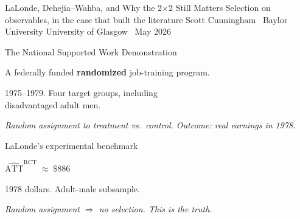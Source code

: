 \documentclass[11pt,aspectratio=169]{beamer}
\begin{document}
\remixtitleframe
  {LaLonde, Dehejia--Wahba, and Why the 2$\times$2 Still Matters}
  {Selection on observables, in the case that built the literature}
  {Scott Cunningham \textperiodcentered\ Baylor University}
  {University of Glasgow \textperiodcentered\ May 2026}


\begin{frame}{The National Supported Work Demonstration}
\vspace{1em}
\begin{center}
\large
A federally funded \textbf{randomized} job-training program.
\end{center}
\vspace{0.4em}
\begin{center}
\large
1975--1979. Four target groups, including \\[0.2em] disadvantaged adult men.
\end{center}
\vspace{0.6em}
\begin{center}
\small\color{warmgray}\itshape
Random assignment to treatment vs.\ control. \;Outcome: real earnings in 1978.
\end{center}
\end{frame}

\begin{frame}{LaLonde's experimental benchmark}
\vspace{1.6em}
\begin{center}
\Large
$\widehat{\text{ATT}}^{\text{RCT}} \;\approx\; \$886$
\end{center}
\vspace{0.6em}
\begin{center}
1978 dollars. \;Adult-male subsample.
\end{center}
\vspace{1em}
\begin{center}
\small\color{warmgray}\itshape
Random assignment $\Rightarrow$ no selection. \;This is the \textit{truth}.
\end{center}
\end{frame}
\end{document}

